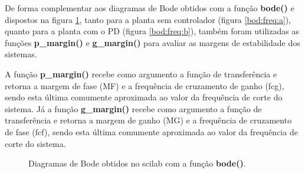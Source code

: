 De forma complementar aos diagramas de Bode obtidos com a função \textbf{bode()} e dispostos na figura \ref{bod:freq}, tanto para a planta sem controlador (figura \ref{bod:freq:a}), quanto para a planta com o PD (figura \ref{bod:freq:b}), também foram utilizadas as funções \textbf{p\_margin()} e \textbf{g\_margin()} para avaliar as margens de estabilidade dos sistemas. 

A função \textbf{p\_margin()} recebe como argumento a função de transferência e retorna a margem de fase (MF) e a frequência de cruzamento de ganho (fcg), sendo esta última comumente aproximada ao valor da frequência de corte do sistema. Já a função \textbf{g\_margin()} recebe como argumento a função de transferência e retorna a margem de ganho (MG) e a frequência de cruzamento de fase (fcf), sendo esta última comumente aproximada ao valor da frequência de corte do sistema.

\begin{figure}[H]
\begin{center}
\end{center}
\caption{Diagramas de Bode obtidos no scilab com a função \textbf{bode()}.}
\label{bod:freq} 
\end{figure}

